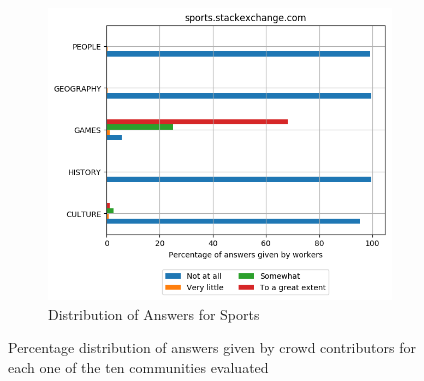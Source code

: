 \begin{figure}[H]
         \begin{subfigure}{0.5\textwidth}
    \centering
        \includegraphics[width=1\linewidth]{imgs/crowd-results/sports_stackexchange_com}
        \caption{Distribution of Answers for Sports}
        \label{fig:crowd-results-sports}
    \end{subfigure}%
 \caption{Percentage distribution of answers given by crowd contributors for each one of the ten communities evaluated }
    \label{fig:complete-crowd-distribution}
    
\end{figure}